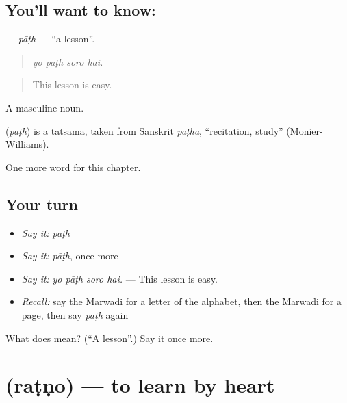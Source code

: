 \subsection*{You'll want to know: }
\textbf{} — \emph{pāṭh} — \textquotedblleft{}a lesson\textquotedblright{}.

\begin{quote}
   
\end{quote}

\begin{quote}
\emph{yo pāṭh soro hai.}
\end{quote}

\begin{quote}
This lesson is easy.
\end{quote}

A masculine noun.

\begin{cousinweb}
\textbf{} (\emph{pāṭh}) is a tatsama, taken from Sanskrit \emph{pāṭha}, \textquotedblleft{}recitation, study\textquotedblright{} (Monier-Williams).
\end{cousinweb}

\begin{grammarlens}[title={What you've built}]
One more word for this chapter.
\end{grammarlens}

\subsection*{Your turn}
\begin{itemize}
\raggedright
  \item \emph{Say it:} \emph{pāṭh}
  \item \emph{Say it:} \emph{pāṭh}, once more
  \item \emph{Say it:} \emph{yo pāṭh soro hai.} — This lesson is easy.
  \item \emph{Recall:} say the Marwadi for a letter of the alphabet, then the Marwadi for a page, then say \emph{pāṭh} again
\end{itemize}

\begin{tcolorbox}[breakable,colback=teal!4,colframe=teal!35!black,title={Before you move on}]
What does  mean? (\textquotedblleft{}A lesson\textquotedblright{}.) Say it once more.
\end{tcolorbox}
\section[\texorpdfstring{\mw{रटणो} (raṭṇo)}{रटणो (raṭṇo)}]{ (raṭṇo) — to learn by heart}

